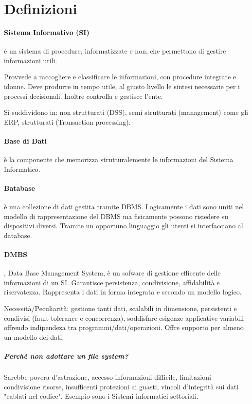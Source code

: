 \section{Definizioni}
\paragraph{Sistema Informativo (SI)} è un sistema di procedure, informatizzate e non, che permettono di gestire informazioni utili.

Provvede a raccogliere e classificare le informazioni, con procedure integrate e idonne. Deve produrre in tempo utile, al giusto livello le sintesi necessarie per i processi decisionali. Inoltre controlla e gestisce l'ente.

Si suddividono in: non strutturati (DSS), semi strutturati (management) come gli ERP, strutturati (Transaction processing).
\paragraph{Base di Dati} è la componente che memorizza strutturalemente le informazioni del Sistema Informatico.
\paragraph{Batabase} è una collezione di dati gestita tramite DBMS. Logicamente i dati sono uniti nel modello di rappresentazione del DBMS ma fisicamente possono risiedere su dispositivi diversi. Tramite un opportuno linguaggio gli utenti si interfacciano al database.
\paragraph{DMBS}, Data Base Management System, è un sofware di gestione efficente delle informazioni di un SI. Garantisce persistenza, condivisione, affidabilità e riservatezza. Rappresenta i dati in forma integrata e secondo un modello logico.

Necessità/Peculiarità: gestione tanti dati, scalabili in dimensione, persistenti e condivisi (fault tolerance e concorrenza), soddisfare esigenze applicative variabili offrendo indipendeza tra programmi/dati/operazioni. Offre supporto per almeno un modello dei dati.
\subparagraph{Perchè non adottare un file system?} Sarebbe povera d'astrazione, accesso informazioni difficile, limitazioni condivisione risorse, insufficenti protezioni ai guasti, vincoli d'integrità sui dati "cablati nel codice".
Esempio sono i Sistemi informatici settoriali.

